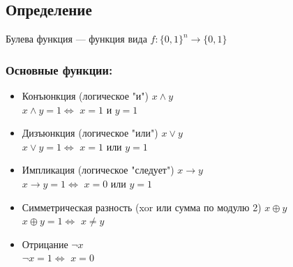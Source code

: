 \subsection{Определение}

\begin{defn}
    Булева функция --- функция вида $f: \{0, 1\}^n \to \{0, 1\}$
\end{defn}

\subsubsection*{Основные функции:}

\begin{itemize}
    \item Конъюнкция (логическое "и") $x \wedge y$ \\ 
    $x \wedge y = 1 \iff$ $x = 1$ и $y = 1$

    \item Дизъюнкция (логическое "или") $x \vee y$ \\ 
    $x \vee y = 1 \iff$ $x = 1$ или $y = 1$
    
    \item Импликация (логическое "следует") $x \to y$ \\ 
    $x \to y = 1 \iff$ $x = 0$ или $y = 1$
    
    \item Симметрическая разность (xor или сумма по модулю 2) $x \oplus y$ \\ 
    $x \oplus y = 1 \iff$ $x \neq  y$
    
    \item Отрицание $\neg x$ \\ 
    $\neg x = 1 \iff$ $x = 0$
\end{itemize}
